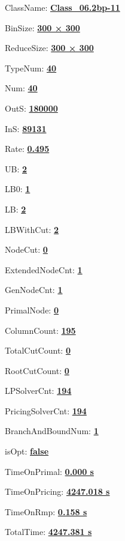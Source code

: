 \documentclass[11pt]{article}
\begin{document}
\pagestyle{empty}


ClassName: \underline{\textbf{Class_06.2bp-11}}
\par
BinSize: \underline{\textbf{300 × 300}}
\par
ReduceSize: \underline{\textbf{300 × 300}}
\par
TypeNum: \underline{\textbf{40}}
\par
Num: \underline{\textbf{40}}
\par
OutS: \underline{\textbf{180000}}
\par
InS: \underline{\textbf{89131}}
\par
Rate: \underline{\textbf{0.495}}
\par
UB: \underline{\textbf{2}}
\par
LB0: \underline{\textbf{1}}
\par
LB: \underline{\textbf{2}}
\par
LBWithCut: \underline{\textbf{2}}
\par
NodeCut: \underline{\textbf{0}}
\par
ExtendedNodeCnt: \underline{\textbf{1}}
\par
GenNodeCnt: \underline{\textbf{1}}
\par
PrimalNode: \underline{\textbf{0}}
\par
ColumnCount: \underline{\textbf{195}}
\par
TotalCutCount: \underline{\textbf{0}}
\par
RootCutCount: \underline{\textbf{0}}
\par
LPSolverCnt: \underline{\textbf{194}}
\par
PricingSolverCnt: \underline{\textbf{194}}
\par
BranchAndBoundNum: \underline{\textbf{1}}
\par
isOpt: \underline{\textbf{false}}
\par
TimeOnPrimal: \underline{\textbf{0.000 s}}
\par
TimeOnPricing: \underline{\textbf{4247.018 s}}
\par
TimeOnRmp: \underline{\textbf{0.158 s}}
\par
TotalTime: \underline{\textbf{4247.381 s}}
\par
\newpage
\end{document}

